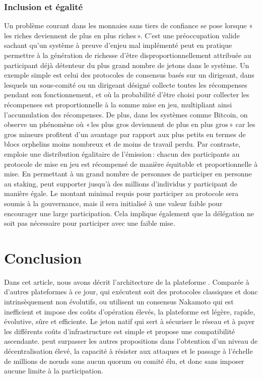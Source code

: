 \documentclass[runningheads,francais,a4paper]{llncs}
\begin{document}
\subsubsection{Inclusion et égalité}
Un problème courant dans les monnaies sans tiers de confiance se pose lorsque «\,les riches deviennent de plus en plus
riches\,». C'est une préoccupation valide sachant qu'un système à preuve d'enjeu mal implémenté peut en pratique permettre à
la génération de richesse d'être disproportionnellement attribuée au participant déjà détenteur du plus grand nombre de
jetons dans le système. Un exemple simple est celui des protocoles de consensus basés sur un dirigeant, dans lesquels un
sous-comité ou un dirigeant désigné collecte toutes les récompenses pendant son fonctionnement, et où la probabilité d'être
choisi pour collecter les récompenses est proportionnelle à la somme mise en jeu, multipliant ainsi l'accumulation des
récompenses. De plus, dans les systèmes comme Bitcoin, on observe un phénomène où «\,les plus gros
deviennent de plus en plus gros\,» car les gros mineurs profitent d'un avantage par rapport aux plus petits en termes
de blocs orphelins moins nombreux et de moins de travail perdu. Par contraste, \AVAPlatformName{} emploie une distribution
égalitaire de l'émission\,: chacun des participants au protocole de mise en jeu est récompensé de manière équitable et
proportionnelle à mise. En permettant à un grand nombre de personnes de participer en personne
au staking, \AVAPlatformName{} peut supporter jusqu'à des millions d'individus y participant de manière égale. Le
montant minimal requis pour participer au protocole sera soumis à la gouvernance, mais il sera initialisé à une valeur
faible pour encourager une large participation. Cela implique également que la délégation ne soit pas nécessaire pour
participer avec une faible mise.

\section{Conclusion}
\label{section:conclusion}
Dans cet article, nous avons décrit l'architecture de la plateforme \AVAPlatformName{}. Comparée à d'autres plateformes à
ce jour, qui exécutent soit des protocoles classiques et donc intrinsèquement non évolutifs, ou utilisent un consensus
Nakamoto qui est inefficient et impose des coûts d'opération élevés, la plateforme \AVAPlatformName{} est légère, rapide,
évolutive, sûre et efficiente. Le jeton natif qui sert à sécuriser le réseau et à payer les différents coûts
d'infrastructure est simple et propose une compatibilité ascendante. \AVATokenName{} peut surpasser les
autres propositions dans l'obtention d'un niveau de décentralisation élevé, la capacité à résister aux attaques et le
passage à l'échelle de millions de nœuds sans aucun quorum ou comité élu, et donc sans imposer aucune limite à la
participation.
\end{document}
